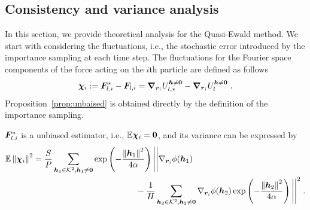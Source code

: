 \subsection{Consistency and variance analysis}
In this section, we provide theoretical analysis for the Quasi-Ewald method. We start with considering the fluctuations, i.e., the stochastic error introduced by the importance sampling at each time step.
The fluctuations for the Fourier space components of   the force acting on the $i$th particle are defined as follows 
\begin{equation}\label{eq::xichi}
    \boldsymbol{\chi}_{i} :=\bm{F}_{l,i}^*-\bm{F}_{l,i}=\boldsymbol{\nabla}_{\boldsymbol{r}_i} U_{l,\ast}^{\boldsymbol{h}\neq \bm{0}}-\boldsymbol{\nabla}_{\boldsymbol{r}_i} U_{l}^{\boldsymbol{h}\neq \bm{0}}\;.
\end{equation}
Proposition~\ref{prop:unbaised} is obtained directly by the definition of the importance sampling.
\begin{prop}\label{prop:unbaised}
	  $\bm{F}_{l,i}^*$ is a  unbiased estimator, i.e.,  $\mathbb{E} \boldsymbol{\chi}_{i} = \bm 0$, and its variance  can be expressed by
\begin{align*}
		\mathbb{E}\left\lVert\boldsymbol{\chi}_{i}\right\rVert^2&=\frac{S}{P}\sum_{\bm{h}_1\in\mathcal{K}^2, \bm{h}_1\neq \bm{0}}\exp\left(-\frac{\left\lVert\boldsymbol{h}_1\right\rVert^2}{4\alpha}\right)\Bigg|\Bigg|\nabla_{\bm{r}_i}\phi(\boldsymbol{h}_1)\\
        &~~~~~~~~~~~~~~~~~~~~~~~~~~~~~~~~~~~~~-\frac{1}{H} \sum_{\bm{h}_2\in\mathcal{K}^2, \bm{h}_2\neq \bm{0}}\nabla_{\bm{r}_i}\phi(\boldsymbol{h}_2)\exp\left(-\frac{\left\lVert\boldsymbol{h}_2\right\rVert^2}{4\alpha}\right)\Bigg|\Bigg|^2\;.
\end{align*}
\end{prop}
